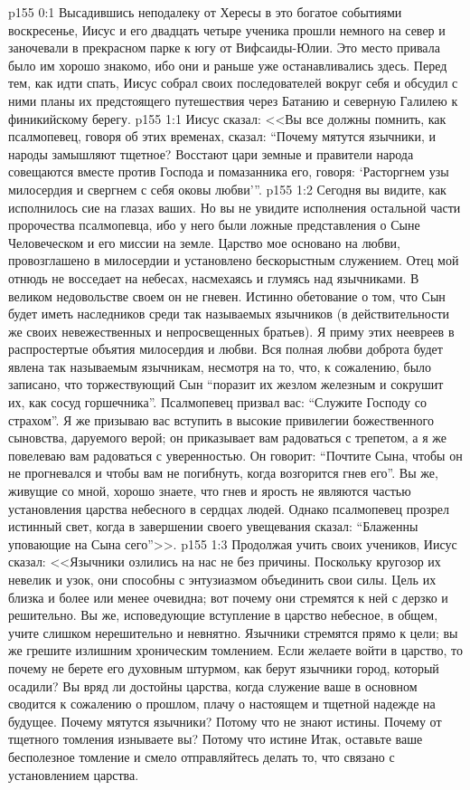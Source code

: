 \vs p155 0:1 Высадившись неподалеку от Хересы в это богатое событиями воскресенье, Иисус и его двадцать четыре ученика прошли немного на север и заночевали в прекрасном парке к югу от Вифсаиды\hyp{}Юлии. Это место привала было им хорошо знакомо, ибо они и раньше уже останавливались здесь. Перед тем, как идти спать, Иисус собрал своих последователей вокруг себя и обсудил с ними планы их предстоящего путешествия через Батанию и северную Галилею к финикийскому берегу.
\vs p155 1:1 Иисус сказал: <<Вы все должны помнить, как псалмопевец, говоря об этих временах, сказал: “Почему мятутся язычники, и народы замышляют тщетное? Восстают цари земные и правители народа совещаются вместе против Господа и помазанника его, говоря: ‘Расторгнем узы милосердия и свергнем с себя оковы любви’”.
\vs p155 1:2 Сегодня вы видите, как исполнилось сие на глазах ваших. Но вы не увидите исполнения остальной части пророчества псалмопевца, ибо у него были ложные представления о Сыне Человеческом и его миссии на земле. Царство мое основано на любви, провозглашено в милосердии и установлено бескорыстным служением. Отец мой отнюдь не восседает на небесах, насмехаясь и глумясь над язычниками. В великом недовольстве своем он не гневен. Истинно обетование о том, что Сын будет иметь наследников среди так называемых язычников (в действительности же своих невежественных и непросвещенных братьев). Я приму этих неевреев в распростертые объятия милосердия и любви. Вся полная любви доброта будет явлена так называемым язычникам, несмотря на то, что, к сожалению, было записано, что торжествующий Сын “поразит их жезлом железным и сокрушит их, как сосуд горшечника”. Псалмопевец призвал вас: “Служите Господу со страхом”. Я же призываю вас вступить в высокие привилегии божественного сыновства, даруемого верой; он приказывает вам радоваться с трепетом, а я же повелеваю вам радоваться с уверенностью. Он говорит: “Почтите Сына, чтобы он не прогневался и чтобы вам не погибнуть, когда возгорится гнев его”. Вы же, живущие со мной, хорошо знаете, что гнев и ярость не являются частью установления царства небесного в сердцах людей. Однако псалмопевец прозрел истинный свет, когда в завершении своего увещевания сказал: “Блаженны уповающие на Сына сего”>>.
\vs p155 1:3 Продолжая учить своих учеников, Иисус сказал: <<Язычники озлились на нас не без причины. Поскольку кругозор их невелик и узок, они способны с энтузиазмом объединить свои силы. Цель их близка и более или менее очевидна; вот почему они стремятся к ней с дерзко и решительно. Вы же, исповедующие вступление в царство небесное, в общем, учите слишком нерешительно и невнятно. Язычники стремятся прямо к цели; вы же грешите излишним хроническим томлением. Если желаете войти в царство, то почему не берете его духовным штурмом, как берут язычники город, который осадили? Вы вряд ли достойны царства, когда служение ваше в основном сводится к сожалению о прошлом, плачу о настоящем и тщетной надежде на будущее. Почему мятутся язычники? Потому что не знают истины. Почему от тщетного томления изнываете вы? Потому что истине  Итак, оставьте ваше бесполезное томление и смело отправляйтесь делать то, что связано с установлением царства.
